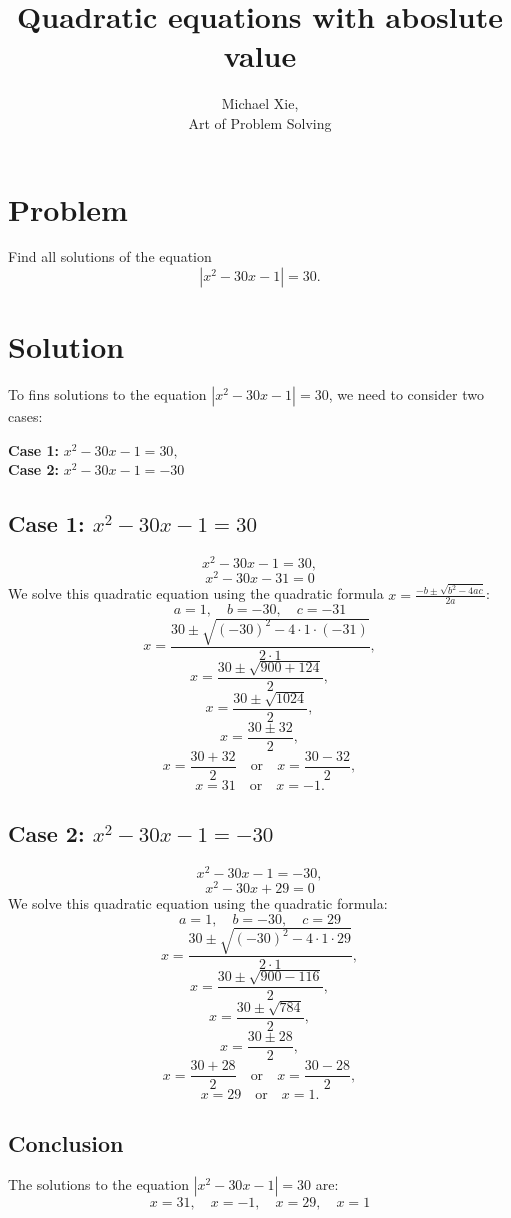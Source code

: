 \documentclass{article}
\title{Quadratic equations with aboslute value}
\author{Michael Xie, \\ Art of Problem Solving}
\begin{document}
\maketitle

\section*{Problem}
Find all solutions of the equation
\[
|x^2 - 30x - 1| = 30.
\]

\section*{Solution}
To fins solutions to the equation \( |x^2 - 30x - 1| = 30 \), we need to consider two cases:

\begin{center}
    \textbf{Case 1:} \( x^2 - 30x - 1 = 30, \) \\
    \textbf{Case 2:} \( x^2 - 30x - 1 = -30 \)
\end{center}

\subsection*{Case 1: \( x^2 - 30x - 1 = 30 \)}
\[
x^2 - 30x - 1 = 30,
\]
\[
x^2 - 30x - 31 = 0
\]
We solve this quadratic equation using the quadratic formula \( x = \frac{-b \pm \sqrt{b^2 - 4ac}}{2a} \):
\[
a = 1, \quad b = -30, \quad c = -31
\]
\[
x = \frac{30 \pm \sqrt{(-30)^2 - 4 \cdot 1 \cdot (-31)}}{2 \cdot 1},
\]
\[
x = \frac{30 \pm \sqrt{900 + 124}}{2},
\]
\[
x = \frac{30 \pm \sqrt{1024}}{2},
\]
\[
x = \frac{30 \pm 32}{2},
\]
\[
x = \frac{30 + 32}{2} \quad \text{or} \quad x = \frac{30 - 32}{2},
\]
\[
x = 31 \quad \text{or} \quad x = -1.
\]

\subsection*{Case 2: \( x^2 - 30x - 1 = -30 \)}
\[
x^2 - 30x - 1 = -30,
\]
\[
x^2 - 30x + 29 = 0
\]
We solve this quadratic equation using the quadratic formula:
\[
a = 1, \quad b = -30, \quad c = 29
\]
\[
x = \frac{30 \pm \sqrt{(-30)^2 - 4 \cdot 1 \cdot 29}}{2 \cdot 1},
\]
\[
x = \frac{30 \pm \sqrt{900 - 116}}{2},
\]
\[
x = \frac{30 \pm \sqrt{784}}{2},
\]
\[
x = \frac{30 \pm 28}{2},
\]
\[
x = \frac{30 + 28}{2} \quad \text{or} \quad x = \frac{30 - 28}{2},
\]
\[
x = 29 \quad \text{or} \quad x = 1.
\]

\subsection*{Conclusion}
The solutions to the equation \( |x^2 - 30x - 1| = 30 \) are:
\[
x = 31, \quad x = -1, \quad x = 29, \quad x = 1
\]
\end{document}
